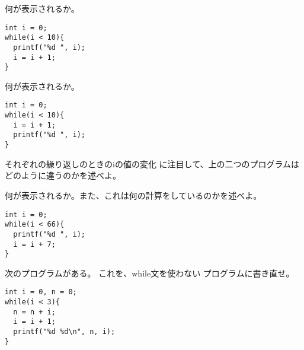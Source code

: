 \documentclass[12pt,a4j]{jarticle}
\newcounter{toi}
\def\toi{%
\bigskip\bigskip\noindent
\addtocounter{toi}{1}
\shadowbox{\bfseries\large 問\thetoi}
\nopagebreak[4]\bigskip\nopagebreak[4]
}
\begin{document}
\toi

何が表示されるか。
\begin{verbatim}
int i = 0;
while(i < 10){
  printf("%d ", i);
  i = i + 1;
}
\end{verbatim}

何が表示されるか。
\begin{verbatim}
int i = 0;
while(i < 10){
  i = i + 1;
  printf("%d ", i);
}
\end{verbatim}
それぞれの繰り返しのときの{\ttfamily i}の値の変化
に注目して、上の二つのプログラムはどのように違うのかを述べよ。






\toi
\label{toi:7multiples}

何が表示されるか。また、これは何の計算をしているのかを述べよ。
\begin{verbatim}
int i = 0;
while(i < 66){
  printf("%d ", i);
  i = i + 7;
}
\end{verbatim}





\toi

次のプログラムがある。
これを、{\ttfamily while}文を使わない
プログラムに書き直せ。

\begin{verbatim}
int i = 0, n = 0;
while(i < 3){
  n = n + i;
  i = i + 1;
  printf("%d %d\n", n, i);
}
\end{verbatim}



\vspace{3cm}


\toi
\end{document}
